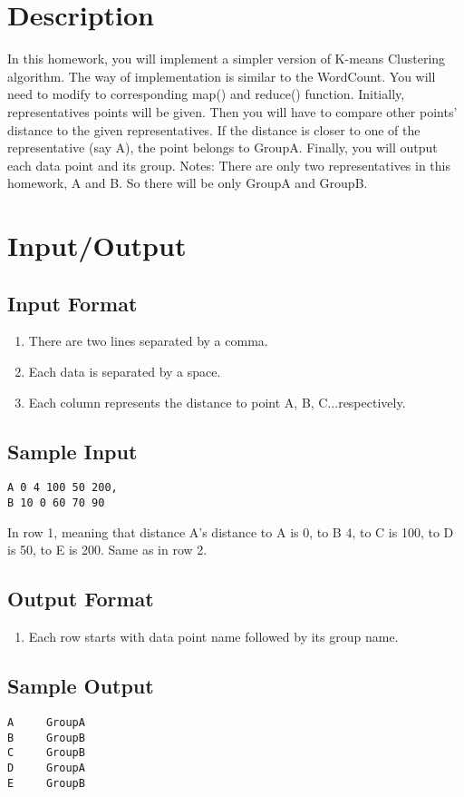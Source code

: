 \documentclass[a4paper,10pt]{article}
\begin{document}
\section{Description}
In this homework, you will implement a simpler version of K-means Clustering algorithm. The way of implementation is similar to the WordCount. You will
need to modify to corresponding map() and reduce() function.
Initially, representatives points will be given. Then you will have to compare other points' distance to the given
representatives. If the distance is closer to one of the representative (say A), the point belongs to GroupA. Finally, you will output each data
point and its group.
Notes: There are only two representatives in this homework, A and B. So there will be only GroupA and GroupB.

\section{Input/Output}
\subsection{Input Format}
\begin{enumerate}
\item There are two lines separated by a comma.
\item Each data is separated by a space.
\item Each column represents the distance to point A, B, C...respectively.
\end{enumerate}

\subsection{Sample Input}
\begin{verbatim}
A 0 4 100 50 200,
B 10 0 60 70 90
\end{verbatim}
In row 1, meaning that distance A's distance to A is 0, to B 4, to C is 100, to D is 50, to E is 200.
Same as in row 2.

\subsection{Output Format}
\begin{enumerate}
\item Each row starts with data point name followed by its group name.
\end{enumerate}

\subsection{Sample Output}
\begin{verbatim}
A	  GroupA
B	  GroupB
C	  GroupB
D	  GroupA
E	  GroupB
\end{verbatim}
\end{document}
